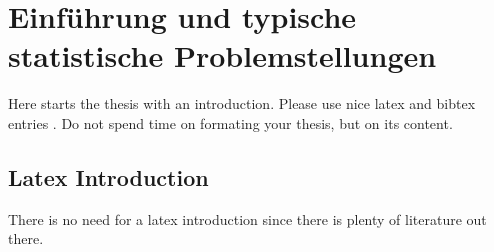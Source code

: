 \chapter{Einführung und typische statistische Problemstellungen}

Here starts the thesis with an introduction. Please use nice latex and bibtex entries \cite{latex}. Do not spend time on formating your thesis, but on its content.

\section{Latex Introduction}
There is no need for a latex introduction since there is plenty of literature out there.
